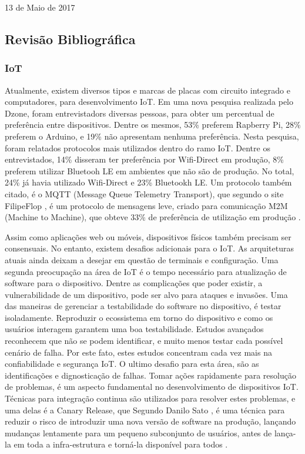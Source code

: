 \documentclass[journal]{IEEEtran}
\begin{document}
\hfill 13 de Maio de 2017

\subsection{Revisão Bibliográfica}
\subsubsection{IoT}

Atualmente, existem diversos tipos e marcas de placas com circuito integrado e computadores, para desenvolvimento IoT. Em uma nova pesquisa realizada pelo Dzone, foram entrevistadors diversas pessoas, para obter um percentual de preferência entre dispositivos. Dentre os mesmos, 53\% preferem Rapberry Pi, 28\% preferem o Arduino, e 19\% não apresentam nenhuma preferência. Nesta pesquisa, foram relatados protocolos mais utilizados dentro do ramo IoT. Dentre os entrevistados, 14\% disseram ter preferência por Wifi-Direct em produção, 8\% preferem utilizar Bluetooh LE em ambientes que não são de produção. No total, 24\% já havia utilizado Wifi-Direct e 23\% Bluetookh LE. Um protocolo também citado, é o MQTT (Message Queue Telemetry Transport), que segundo o site FilipeFlop \cite{filipeflopnodemcu}, é um protocolo de mensagens leve, criado para comunicação M2M (Machine to Machine), que obteve 33\% de preferência de utilização em produção \cite[p.~4]{dzoneiotvolume4}.

Assim como aplicações web ou móveis, dispositivos físicos também precisam ser consensuais. No entanto, existem desafios adicionais para o IoT. As arquiteturas atuais ainda deixam a desejar em questão de terminais e configuração. Uma segunda preocupação na área de IoT é o tempo necessário para atualização de software para o dispositivo. Dentre as complicações que poder existir, a vulnerabilidade de um dispositivo, pode ser alvo para ataques e invasões. Uma das maneiras de gerenciar a testabilidade do software no dispositivo, é testar isoladamente. Reproduzir o ecossistema em torno do dispositivo e como os usuários interagem garantem uma boa testabilidade. Estudos avançados reconhecem que não se podem identificar, e muito menos testar cada possível cenário de falha. Por este fato, estes estudos concentram cada vez mais na confiabilidade e segurança IoT. O ultimo desafio para esta área, são as identificações e dignosticação de falhas. Tomar ações rapidamente para resolução de problemas, é um aspecto fundamental no desenvolvimento de dispositivos IoT. Técnicas para integração continua são utilizados para resolver estes problemas, e uma delas é a Canary Release, que Segundo Danilo Sato \cite{danilosato2017}, é uma técnica para reduzir o risco de introduzir uma nova versão de software na produção, lançando mudanças lentamente para um pequeno subconjunto de usuários, antes de lança-la em toda a infra-estrutura e torná-la disponível para todos \cite[p.~9]{dzoneiotvolume4}.
\end{document}
